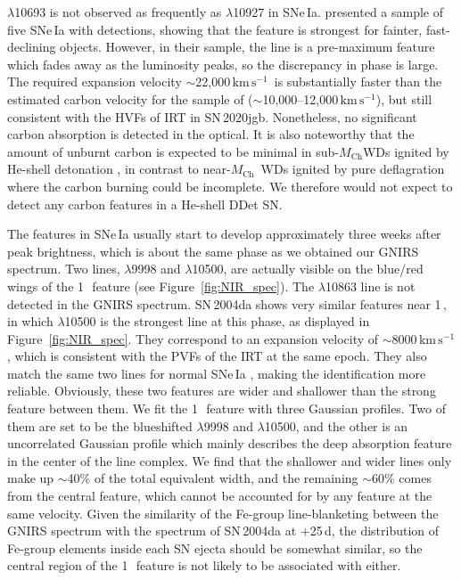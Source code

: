 \documentclass[twocolumn]{aastex631}
\newcommand{\sn}{SN\,2020jgb}
\newcommand{\Mch}{$M_\mathrm{Ch}$}
\newcommand{\kms}{$\mathrm{km}\,\mathrm{s}^{-1}$}
\begin{document}
 $\lambda$10693 is not observed as frequently as  $\lambda$10927 in SNe\,Ia. \citet{Hsiao_CSP_2019} presented a sample of five SNe\,Ia with  detections, showing that the  feature is strongest for fainter, fast-declining objects. However, in their sample, the  line is a pre-maximum feature which fades away as the luminosity peaks, so the discrepancy in phase is large. The required expansion velocity $\sim$22,000\,\kms\ is substantially faster than the estimated carbon velocity for the sample of \citet{Hsiao_CSP_2019} ($\sim$10,000--12,000\,\kms), but still consistent with the HVFs of  IRT in \sn. Nonetheless, no significant carbon absorption is detected in the optical. It is also noteworthy that the amount of unburnt carbon is expected to be minimal in sub-\Mch WDs ignited by He-shell detonation \citep{polin_observational_2019}, in contrast to near-\Mch\ WDs ignited by pure deflagration where the carbon burning could be incomplete. We therefore would not expect to detect any carbon features in a He-shell DDet SN.

The  features in SNe\,Ia usually start to develop approximately three weeks after peak brightness, which is about the same phase as we obtained our GNIRS spectrum. Two  lines, $\lambda$9998 and $\lambda$10500, are actually visible on the blue/red wings of the 1\,\micron\ feature (see Figure~\ref{fig:NIR_spec}). The  $\lambda$10863 line is not detected in the GNIRS spectrum. SN\,2004da shows very similar  features near 1\,\micron, in which  $\lambda$10500 is the strongest line at this phase, as displayed in Figure~\ref{fig:NIR_spec}. They correspond to an expansion velocity of $\sim$8000\,\kms, which is consistent with the PVFs of the  IRT at the same epoch. They also match the same two lines for normal SNe\,Ia \citep{Marion2009_NIR}, making the identification more reliable. Obviously, these two  features are wider and shallower than the strong feature between them. We fit the 1\,\micron\ feature with three Gaussian profiles. Two of them are set to be the blueshifted  $\lambda$9998 and $\lambda$10500, and the other is an uncorrelated Gaussian profile which mainly describes the deep absorption feature in the center of the line complex. We find that the shallower and wider  lines only make up $\sim$40\% of the total equivalent width, and the remaining $\sim$60\% comes from the central feature, which cannot be accounted for by any  feature at the same velocity. Given the similarity of the Fe-group line-blanketing between the GNIRS spectrum with the spectrum of SN\,2004da at +25\,d, the distribution of Fe-group elements inside each SN ejecta should be somewhat similar, so the central region of the 1\,\micron\ feature is not likely to be associated with  either.
\end{document}
